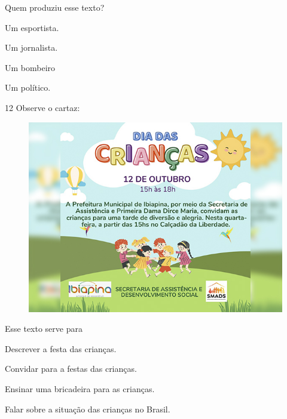 Quem produziu esse texto?

\begin{escolha}
\item Um esportista.

\item Um jornalista.

\item Um bombeiro

\item Um político.
\end{escolha}

\pagebreak
\num{12} Observe o cartaz:

\begin{figure}[htpb!]
\centering
\includegraphics[width=\textwidth]{media/image181.jpeg}
\end{figure}


Esse texto serve para

\begin{escolha}
\item Descrever a festa das crianças.

\item Convidar para a festas das crianças.

\item Ensinar uma bricadeira para as crianças.

\item Falar sobre a situação das crianças no Brasil.
\end{escolha}


